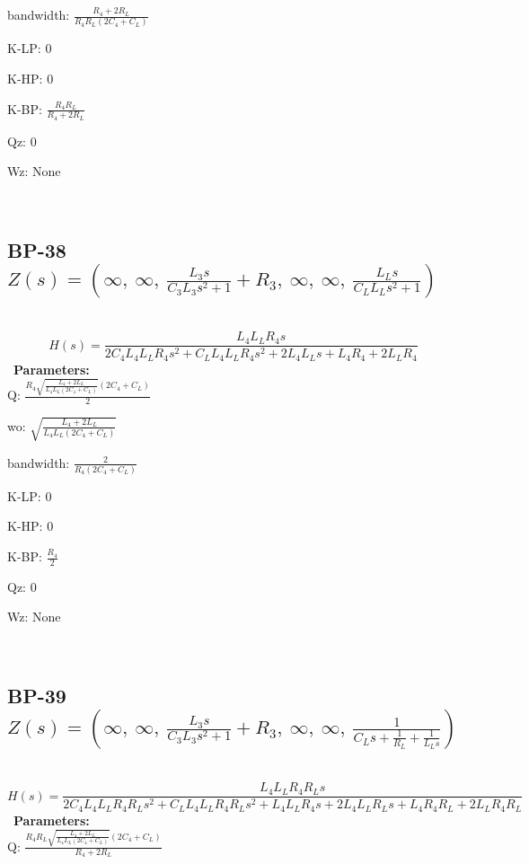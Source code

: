 \documentclass{article}
\begin{document}
bandwidth: $\frac{R_{4} + 2 R_{L}}{R_{4} R_{L} \left(2 C_{4} + C_{L}\right)}$\ 

K-LP: $0$\ 

K-HP: $0$\ 

K-BP: $\frac{R_{4} R_{L}}{R_{4} + 2 R_{L}}$\ 

Qz: $0$\ 

Wz: $\text{None}$\ 

\ 

\subsection{BP-38 $Z(s) = \left( \infty, \  \infty, \  \frac{L_{3} s}{C_{3} L_{3} s^{2} + 1} + R_{3}, \  \infty, \  \infty, \  \frac{L_{L} s}{C_{L} L_{L} s^{2} + 1}\right)$ } \ 
\textbf{\[H(s) = \frac{L_{4} L_{L} R_{4} s}{2 C_{4} L_{4} L_{L} R_{4} s^{2} + C_{L} L_{4} L_{L} R_{4} s^{2} + 2 L_{4} L_{L} s + L_{4} R_{4} + 2 L_{L} R_{4}}\] } \ 
\textbf{Parameters:}\\ 

Q: $\frac{R_{4} \sqrt{\frac{L_{4} + 2 L_{L}}{L_{4} L_{L} \left(2 C_{4} + C_{L}\right)}} \left(2 C_{4} + C_{L}\right)}{2}$\ 

wo: $\sqrt{\frac{L_{4} + 2 L_{L}}{L_{4} L_{L} \left(2 C_{4} + C_{L}\right)}}$\ 

bandwidth: $\frac{2}{R_{4} \left(2 C_{4} + C_{L}\right)}$\ 

K-LP: $0$\ 

K-HP: $0$\ 

K-BP: $\frac{R_{4}}{2}$\ 

Qz: $0$\ 

Wz: $\text{None}$\ 

\ 

\subsection{BP-39 $Z(s) = \left( \infty, \  \infty, \  \frac{L_{3} s}{C_{3} L_{3} s^{2} + 1} + R_{3}, \  \infty, \  \infty, \  \frac{1}{C_{L} s + \frac{1}{R_{L}} + \frac{1}{L_{L} s}}\right)$ } \ 
\textbf{\[H(s) = \frac{L_{4} L_{L} R_{4} R_{L} s}{2 C_{4} L_{4} L_{L} R_{4} R_{L} s^{2} + C_{L} L_{4} L_{L} R_{4} R_{L} s^{2} + L_{4} L_{L} R_{4} s + 2 L_{4} L_{L} R_{L} s + L_{4} R_{4} R_{L} + 2 L_{L} R_{4} R_{L}}\] } \ 
\textbf{Parameters:}\\ 

Q: $\frac{R_{4} R_{L} \sqrt{\frac{L_{4} + 2 L_{L}}{L_{4} L_{L} \left(2 C_{4} + C_{L}\right)}} \left(2 C_{4} + C_{L}\right)}{R_{4} + 2 R_{L}}$\ 
\end{document}
